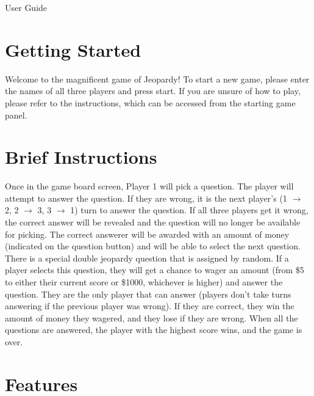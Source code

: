 \documentclass{article}
\begin{document}
\begin{center}
  \huge{User Guide}
\end{center}

\section{Getting Started}
\label{sec:getting-started}

Welcome to the magnificent game of Jeopardy! To start a new game,
please enter the names of all three players and press start. If you
are unsure of how to play, please refer to the instructions, which can
be accessed from the starting game panel.

\section{Brief Instructions}
\label{sec:brief-instructions}

Once in the game board screen, Player 1 will pick a question. The
player will attempt to answer the question. If they are wrong, it is
the next player’s (1 $\rightarrow$ 2, 2 $\rightarrow$ 3, 3
$\rightarrow$ 1) turn to answer the question. If all three players get
it wrong, the correct answer will be revealed and the question will no
longer be available for picking. The correct answerer will be awarded
with an amount of money (indicated on the question button) and will be
able to select the next question. There is a special double jeopardy
question that is assigned by random. If a player selects this
question, they will get a chance to wager an amount (from \$5 to
either their current score or \$1000, whichever is higher) and answer
the question. They are the only player that can answer (players don’t
take turns answering if the previous player was wrong). If they are
correct, they win the amount of money they wagered, and they lose if
they are wrong. When all the questions are answered, the player with
the highest score wins, and the game is over.

\section{Features}
\label{sec:features}
\end{document}
